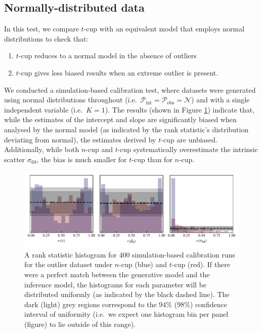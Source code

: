 \documentclass[fleqn,usenatbib]{rasti}
\begin{document}
\subsection{Normally-distributed data}
\label{sec:results.outlier}

In this test, we compare $t$-cup with an equivalent model that employs normal
distributions to check that:
\begin{enumerate}
    \item $t$-cup reduces to a normal model in the absence of outliers
    \item $t$-cup gives less biased results when an extreme outlier is present.
\end{enumerate}

We conducted a simulation-based calibration test, where datasets were generated
using normal distributions throughout (i.e.\ $\mathcal P_{\text{int}} = \mathcal
P_{\text{obs}} = \mathcal{N}$) and with a single independent variable (i.e.\ $K
= 1$). The results (shown in Figure \ref{fig:results.outlier.sbc}) indicate
that, while the estimates of the intercept and slope are significantly biased
when analysed by the normal model (as indicated by the rank statistic's
distribution deviating from normal), the estimates derived by $t$-cup are
unbiased. Additionally, while both $n$-cup and $t$-cup systematically
overestimate the intrinsic scatter $\sigma_{68}$, the bias is much smaller for
$t$-cup than for $n$-cup.


\begin{figure}
    \includegraphics[width=\textwidth]{graphics/sbc/outlier20_sbc.pdf}
    \caption{A rank statistic histogram for 400 simulation-based calibration
    runs for the outlier dataset under $n$-cup (blue) and $t$-cup (red). If
    there were a perfect match between the generative model and the inference
    model, the histograms for each parameter will be distributed uniformly (as
    indicated by the black dashed line). The dark (light) grey regions
    correspond to the 94\% (98\%) confidence interval of uniformity (i.e.\ we
    expect one histogram bin per panel (figure) to lie outside of this range).}
    \label{fig:results.outlier.sbc}
\end{figure}
\end{document}
